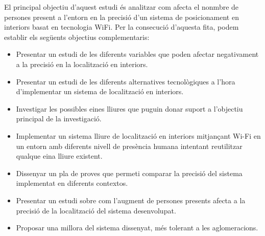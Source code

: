 
El principal objectiu d'aquest estudi és analitzar com afecta el nonmbre de persones present a l'entorn en la precisió d'un sistema de posicionament en interiors basat en tecnologia WiFi. Per la consecució d'aquesta fita, podem establir els següents objectius complementaris:

\begin{itemize}
    \item Presentar un estudi de les diferents variables que poden afectar negativament a la precisió en la localització en interiors.
    \item Presentar un estudi de les diferents alternatives tecnològiques a l'hora d'implementar un sistema de localització en interiors.
    \item Investigar les possibles eines lliures que puguin donar suport a l'objectiu principal de la investigació.
    \item Implementar un sistema lliure de localització en interiors mitjançant Wi-Fi en un entorn amb diferents nivell de presència humana intentant reutilitzar qualque eina lliure existent.
    \item Dissenyar un pla de proves que permeti comparar la precisió del sistema implementat en diferents contextos.
    \item Presentar un estudi sobre com l’augment de persones presents afecta a la precisió de la localització del sistema desenvolupat.
    \item Proposar una millora del sistema dissenyat, més tolerant a les aglomeracions.
\end{itemize}
